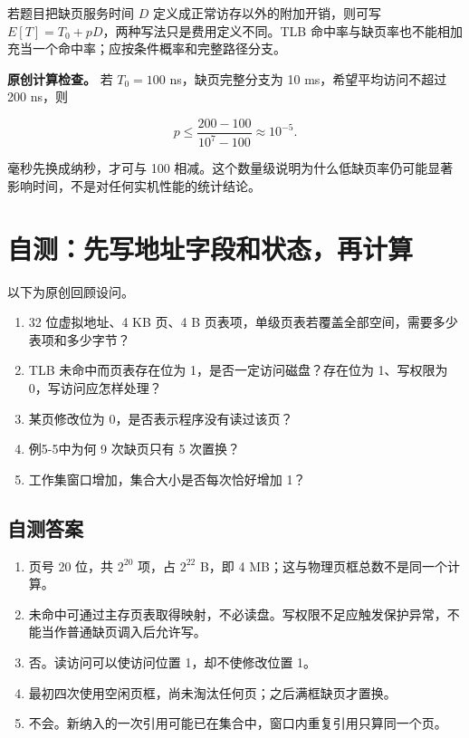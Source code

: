 若题目把缺页服务时间 \(D\) 定义成正常访存以外的附加开销，则可写 \(E[T]=T_0+pD\)，两种写法只是费用定义不同。TLB 命中率与缺页率也不能相加充当一个命中率；应按条件概率和完整路径分支。

\textbf{原创计算检查。} 若 \(T_0=100\) ns，缺页完整分支为 10 ms，希望平均访问不超过 200 ns，则

\[p\le\frac{200-100}{10^7-100}\approx10^{-5}.\]

毫秒先换成纳秒，才可与 100 相减。这个数量级说明为什么低缺页率仍可能显著影响时间，不是对任何实机性能的统计结论。

\section{自测：先写地址字段和状态，再计算}\label{os-5-review}

以下为原创回顾设问。

\begin{enumerate}
\def\labelenumi{\arabic{enumi}.}
\tightlist
\item
  32 位虚拟地址、4 KB 页、4 B 页表项，单级页表若覆盖全部空间，需要多少表项和多少字节？
\item
  TLB 未命中而页表存在位为 1，是否一定访问磁盘？存在位为 1、写权限为 0，写访问应怎样处理？
\item
  某页修改位为 0，是否表示程序没有读过该页？
\item
  例5-5中为何 9 次缺页只有 5 次置换？
\item
  工作集窗口增加，集合大小是否每次恰好增加 1？
\end{enumerate}

\subsection{自测答案}\label{os-c05-h278}

\begin{enumerate}
\def\labelenumi{\arabic{enumi}.}
\tightlist
\item
  页号 20 位，共 \(2^{20}\) 项，占 \(2^{22}\) B，即 4 MB；这与物理页框总数不是同一个计算。
\item
  未命中可通过主存页表取得映射，不必读盘。写权限不足应触发保护异常，不能当作普通缺页调入后允许写。
\item
  否。读访问可以使访问位置 1，却不使修改位置 1。
\item
  最初四次使用空闲页框，尚未淘汰任何页；之后满框缺页才置换。
\item
  不会。新纳入的一次引用可能已在集合中，窗口内重复引用只算同一个页。
\end{enumerate}

